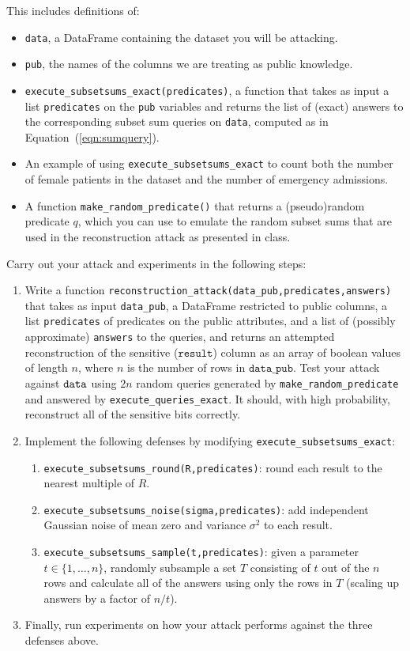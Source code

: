 \documentclass[11pt]{article}
\begin{document}
\begin{enumerate}[leftmargin=*]
This includes definitions of:
\begin{itemize}
    \item \texttt{data}, a DataFrame containing the dataset you will be attacking.
    \item \texttt{pub}, the names of the columns we are treating as public knowledge.
    \item \texttt{execute\_subsetsums\_exact(predicates)}, a function that takes as input a list \texttt{predicates} on the \texttt{pub} variables and returns the list of (exact) answers to the corresponding subset sum queries on \texttt{data}, computed as in Equation~(\ref{eqn:sumquery}).
    \item An example of using \texttt{execute\_subsetsums\_exact} to count both the number of female patients in the dataset and the number of emergency admissions.
    \item A function \texttt{make\_random\_predicate()} that returns a (pseudo)random predicate $q$, which you can use to emulate the random subset sums that are used in the reconstruction attack as presented in class.
\end{itemize}

Carry out your attack and experiments in the following steps:
\begin{enumerate}
    \item Write a function \texttt{reconstruction\_attack(data\_pub,predicates,answers)} that takes as input \texttt{data\_pub}, a DataFrame restricted to public columns, a list \texttt{predicates} of predicates on the public attributes, and a list of  (possibly approximate) \texttt{answers} to the queries, and returns an attempted reconstruction of the sensitive ($\texttt{result}$) column as an array of boolean values of length $n$, where $n$ is the number of rows in $\texttt{data\_pub}$.  
    Test your attack against $\texttt{data}$ using $2n$ random queries generated by \texttt{make\_random\_predicate} and answered by \texttt{execute\_queries\_exact}.  It should, with high probability, reconstruct all of the sensitive bits correctly.
    
    \item Implement the following defenses by modifying \texttt{execute\_subsetsums\_exact}:  
\begin{enumerate}
    \item \texttt{execute\_subsetsums\_round(R,predicates)}: round each result to the nearest multiple of $R$.
    \item \texttt{execute\_subsetsums\_noise(sigma,predicates)}:  add independent Gaussian noise of mean zero and variance $\sigma^2$ to each result.
    \item\texttt{execute\_subsetsums\_sample(t,predicates)}: given a parameter $t\in \{1,\ldots,n\}$, randomly subsample a set $T$ consisting of $t$ out of the $n$ rows and calculate all of the answers using only the rows in $T$ (scaling up answers by a factor of $n/t$).
\end{enumerate}
\item Finally, run experiments on how your attack performs against the three defenses above.


\end{enumerate}
\end{enumerate}
\end{document}
